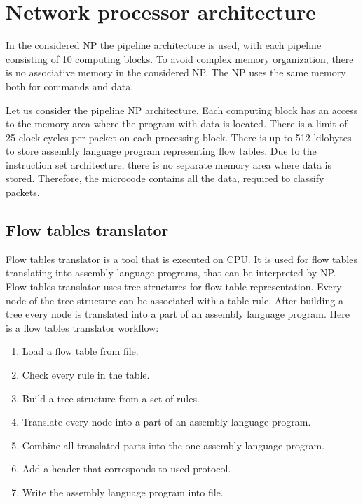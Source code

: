 \documentclass[conference]{IEEEtran}
\begin{document}
    \section{Network processor architecture}
            \label{section:problem}
        In the considered NP the pipeline architecture is used, with each pipeline consisting of 10 computing blocks. 
        To avoid complex memory organization, there is no associative memory in the considered NP. 
        The NP uses the same memory both for commands and data.
         
        Let us consider the pipeline NP architecture. 
        Each computing block has an access to the memory area where the program with data is located.
        There is a limit of 25 clock cycles per packet on each processing block.
        There is up to 512 kilobytes to store assembly language program representing flow tables.
        Due to the instruction set architecture, there is no separate memory area where data is stored. 
        Therefore, the microcode contains all the data, required to classify packets.
        
        \subsection{Flow tables translator}
            Flow tables translator is a tool that is executed on CPU. It is used for flow tables translating
            into assembly language programs, that can be interpreted by NP. Flow tables translator uses 
            tree structures for flow table representation.
            Every node of the tree structure can be associated with a table rule. 
            After building a tree every node is translated into a part of an assembly
            language program. Here is a flow tables translator workflow:
            \begin{enumerate}
                \item Load a flow table from file.
                \item Check every rule in the table.
                \item Build a tree structure from a set of rules.
                \item Translate every node into a part of an assembly language program.
                \item Combine all translated parts into the one assembly language program.
                \item Add a header that corresponds to used protocol.
                \item Write the assembly language program into file.
            \end{enumerate}
\end{document}
